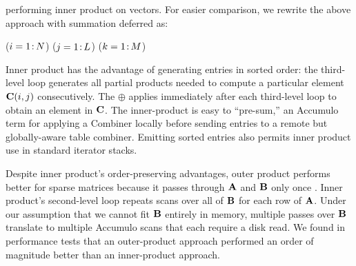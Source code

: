 \noindent %
performing inner product on vectors.
For easier comparison, we rewrite the above approach with summation deferred as:

\removelatexerror
\begin{algorithm}[H]
\vspace{\algspace}
\fore($i = 1\colon\! N$){
\fore($j = 1\colon\! L$){
\fore($k = 1\colon\! M$){
}}}
\vspace{\algspace}
\end{algorithm}

Inner product has the advantage of generating entries in sorted order:
the third-level loop generates all partial products needed 
to compute a particular element $\mathbf{C}(i,j)$ consecutively.
The $\oplus$ applies immediately after each third-level loop to obtain an element in $\mathbf{C}$.
The inner-product is easy to ``pre-sum,'' an Accumulo term for applying a Combiner
locally before sending entries to a remote but globally-aware table combiner.
Emitting sorted entries also permits inner product use in standard iterator stacks.

Despite inner product's order-preserving advantages, 
outer product performs better for sparse matrices 
because it passes through $\mathbf{A}$ and $\mathbf{B}$ only once 
\cite{burkhardt2013big}\cite{burkhardt2014asking}.  
Inner product's second-level loop repeats
scans over all of $\mathbf{B}$ for each row of $\mathbf{A}$.
Under our assumption that we cannot fit $\mathbf{B}$ entirely in memory,
multiple passes over $\mathbf{B}$ translate to multiple Accumulo scans that each require a disk read.
We found in performance tests that an outer-product approach performed an order of magnitude better than an inner-product approach.

